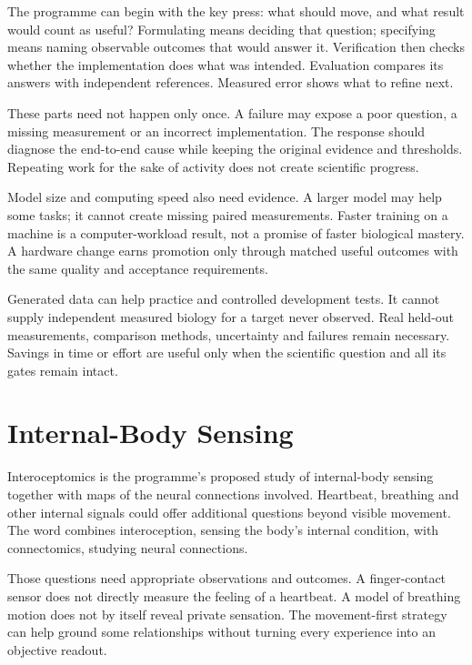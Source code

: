 The programme can begin with the key press: what should move, and what result would count as useful? Formulating means deciding that question; specifying means naming observable outcomes that would answer it. Verification then checks whether the implementation does what was intended. Evaluation compares its answers with independent references. Measured error shows what to refine next.\par

These parts need not happen only once. A failure may expose a poor question, a missing measurement or an incorrect implementation. The response should diagnose the end-to-end cause while keeping the original evidence and thresholds. Repeating work for the sake of activity does not create scientific progress.\par

Model size and computing speed also need evidence. A larger model may help some tasks; it cannot create missing paired measurements. Faster training on a machine is a computer-workload result, not a promise of faster biological mastery. A hardware change earns promotion only through matched useful outcomes with the same quality and acceptance requirements.\par

Generated data can help practice and controlled development tests. It cannot supply independent measured biology for a target never observed. Real held-out measurements, comparison methods, uncertainty and failures remain necessary. Savings in time or effort are useful only when the scientific question and all its gates remain intact.\par

\section{Internal-Body Sensing}

Interoceptomics is the programme's proposed study of internal-body sensing together with maps of the neural connections involved. Heartbeat, breathing and other internal signals could offer additional questions beyond visible movement. The word combines interoception, sensing the body's internal condition, with connectomics, studying neural connections.\par

Those questions need appropriate observations and outcomes. A finger-contact sensor does not directly measure the feeling of a heartbeat. A model of breathing motion does not by itself reveal private sensation. The movement-first strategy can help ground some relationships without turning every experience into an objective readout.\par

